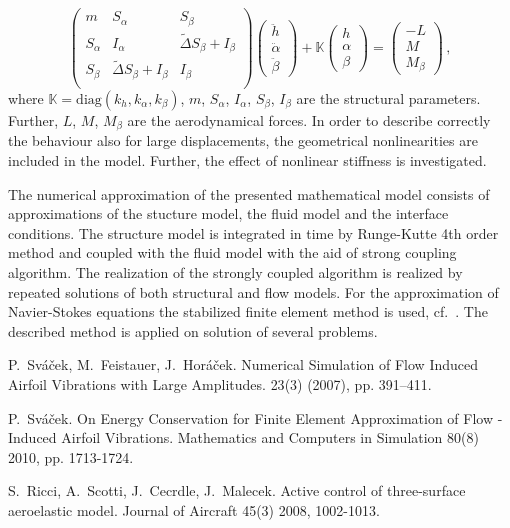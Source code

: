 \begin{equation}
\label{eq:ODE3}
\left(
\begin{array}{ccc}
m & S_\alpha & S_\beta \\
S_\alpha & I_\alpha & \widetilde{\Delta} S_\beta  + I_\beta \\
S_\beta & \widetilde{\Delta} S_\beta + I_\beta & I_\beta \\
\end{array}
\right)
\left( \begin{array}{c} \ddot{h} \\ \ddot{\alpha} \\ \ddot{\beta} \end{array} \right) + {\mathbb K} \left( \begin{array}{c} h \\ \alpha \\ \beta\end{array} \right) = \left( \begin{array}{c} -L  \\ M \\ M_\beta\end{array} \right)\,,
\end{equation}
where ${\mathbb K}=\mbox{diag}( k_{h},k_{\alpha},k_{\beta})$, $m$, $S_\alpha$, $I_\alpha$, $S_\beta$, $I_\beta$ are the structural parameters. Further, $L$, $M$, $M_\beta$ are the aerodynamical forces. In order to describe correctly the behaviour also for large displacements, the geometrical nonlinearities are included in the model. Further, the effect of nonlinear stiffness is investigated.

The numerical approximation of the presented mathematical model consists of approximations of the stucture model, the fluid model and the interface conditions. The structure model is integrated in time by Runge-Kutte 4th order method and coupled with the fluid model with the aid of strong coupling algorithm. The realization of the strongly coupled algorithm is realized by repeated solutions of both structural and flow models. For the approximation of Navier-Stokes equations the stabilized finite element method is used, cf.~\cite{Sva1}. The described method is applied on solution of several problems.


\begin{thebibliography}{10}

{\sc P.~Sv\'{a}\v{c}ek, M.~Feistauer, J.~Hor\'{a}\v{c}ek}.
\newblock Numerical Simulation of Flow Induced Airfoil Vibrations with Large Amplitudes.
 {23}(3) (2007), pp. 391--411.

{\sc P.~Sv\'{a}\v{c}ek}. 
On Energy Conservation for Finite Element Approximation of Flow - Induced Airfoil Vibrations.
\newblock Mathematics and Computers in Simulation 80(8) 2010, pp. 1713-1724.


{\sc S.~Ricci, A.~Scotti, J.~Cecrdle, J.~Malecek}.
Active control of three-surface aeroelastic model.
\newblock Journal of Aircraft 45(3) 2008, 1002-1013.

\end{thebibliography}